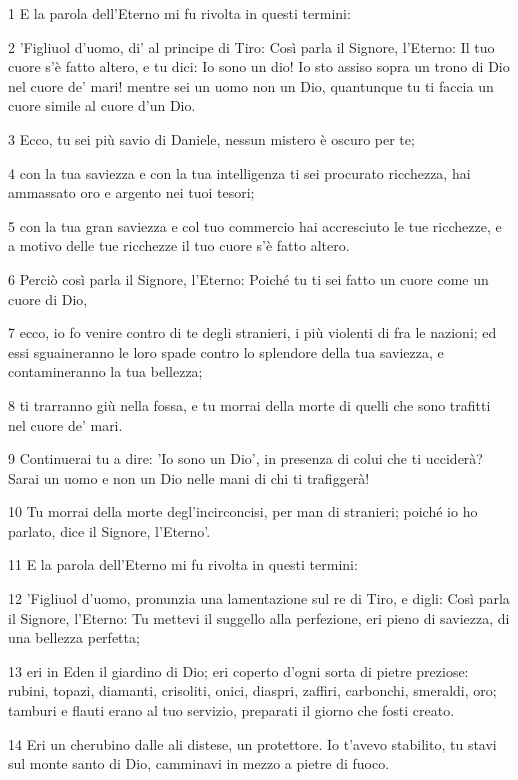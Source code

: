 \par 1 E la parola dell'Eterno mi fu rivolta in questi termini:
\par 2 'Figliuol d'uomo, di' al principe di Tiro: Così parla il Signore, l'Eterno: Il tuo cuore s'è fatto altero, e tu dici: Io sono un dio! Io sto assiso sopra un trono di Dio nel cuore de' mari! mentre sei un uomo non un Dio, quantunque tu ti faccia un cuore simile al cuore d'un Dio.
\par 3 Ecco, tu sei più savio di Daniele, nessun mistero è oscuro per te;
\par 4 con la tua saviezza e con la tua intelligenza ti sei procurato ricchezza, hai ammassato oro e argento nei tuoi tesori;
\par 5 con la tua gran saviezza e col tuo commercio hai accresciuto le tue ricchezze, e a motivo delle tue ricchezze il tuo cuore s'è fatto altero.
\par 6 Perciò così parla il Signore, l'Eterno: Poiché tu ti sei fatto un cuore come un cuore di Dio,
\par 7 ecco, io fo venire contro di te degli stranieri, i più violenti di fra le nazioni; ed essi sguaineranno le loro spade contro lo splendore della tua saviezza, e contamineranno la tua bellezza;
\par 8 ti trarranno giù nella fossa, e tu morrai della morte di quelli che sono trafitti nel cuore de' mari.
\par 9 Continuerai tu a dire: 'Io sono un Dio', in presenza di colui che ti ucciderà? Sarai un uomo e non un Dio nelle mani di chi ti trafiggerà!
\par 10 Tu morrai della morte degl'incirconcisi, per man di stranieri; poiché io ho parlato, dice il Signore, l'Eterno'.
\par 11 E la parola dell'Eterno mi fu rivolta in questi termini:
\par 12 'Figliuol d'uomo, pronunzia una lamentazione sul re di Tiro, e digli: Così parla il Signore, l'Eterno: Tu mettevi il suggello alla perfezione, eri pieno di saviezza, di una bellezza perfetta;
\par 13 eri in Eden il giardino di Dio; eri coperto d'ogni sorta di pietre preziose: rubini, topazi, diamanti, crisoliti, onici, diaspri, zaffiri, carbonchi, smeraldi, oro; tamburi e flauti erano al tuo servizio, preparati il giorno che fosti creato.
\par 14 Eri un cherubino dalle ali distese, un protettore. Io t'avevo stabilito, tu stavi sul monte santo di Dio, camminavi in mezzo a pietre di fuoco.
